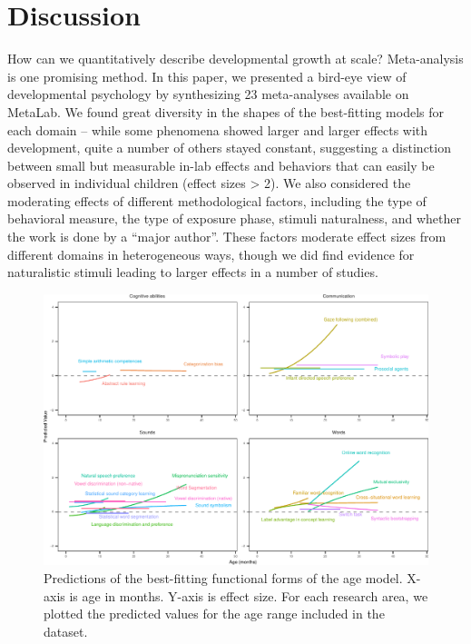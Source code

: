 \documentclass[10pt, letterpaper]{article}
\newenvironment{CodeChunk}{}{}
\begin{document}
\hypertarget{discussion}{%
\section{Discussion}\label{discussion}}

How can we quantitatively describe developmental growth at scale?
Meta-analysis is one promising method. In this paper, we presented a
bird-eye view of developmental psychology by synthesizing 23
meta-analyses available on MetaLab. We found great diversity in the
shapes of the best-fitting models for each domain -- while some
phenomena showed larger and larger effects with development, quite a
number of others stayed constant, suggesting a distinction between small
but measurable in-lab effects and behaviors that can easily be observed
in individual children (effect sizes \textgreater{} 2). We also
considered the moderating effects of different methodological factors,
including the type of behavioral measure, the type of exposure phase,
stimuli naturalness, and whether the work is done by a ``major author''.
These factors moderate effect sizes from different domains in
heterogeneous ways, though we did find evidence for naturalistic stimuli
leading to larger effects in a number of studies.

\begin{CodeChunk}
\begin{figure}[h!]

{\centering \includegraphics{figs/2-col-imageb-1} 

}

\caption[Predictions of the best-fitting functional forms of the age model]{Predictions of the best-fitting functional forms of the age model. X-axis is age in months. Y-axis is effect size. For each research area, we plotted the predicted values for the age range included in the dataset.}\label{fig:2-col-imageb}
\end{figure}
\end{CodeChunk}
\end{document}
